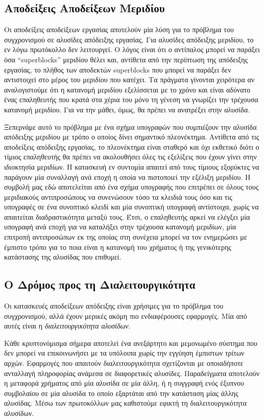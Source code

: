 \subsection*{Αποδείξεις Αποδείξεων Μεριδίου}
Οι αποδείξεις αποδείξεων εργασίας αποτελούν μία λύση για το πρόβλημα του συγχρονισμού σε
αλυσίδες απόδειξης εργασίας. Για αλυσίδες απόδειξης μεριδίου, το εν λόγω πρωτόκολλο δεν λειτουργεί.
Ο λόγος είναι ότι ο αντίπαλος μπορεί να παράξει όσα ``superblocks'' μεριδίου θέλει και,
αντίθετα από την περίπτωση της απόδειξης εργασίας, το πλήθος των αποδεκτών superblocks
που μπορεί να παράξει δεν αντιστοιχεί στο μέρος του μεριδίου που κατέχει. Τα πράγματα γίνονται
χειρότερα αν αναλογιστούμε ότι η κατανομή μεριδίου εξελίσσεται με το χρόνο και είναι αδύνατο
ένας επαληθευτής που κρατά στα χέρια του μόνο τη γένεση να γνωρίζει την τρέχουσα κατανομή μεριδίου.
Για να την μάθει, όμως, θα πρέπει να ανατρέξει στην αλυσίδα.

Ξεπερνάμε αυτό το πρόβλημα με ένα σχήμα υπογραφών που συμπιέζουν την αλυσίδα απόδειξης μεριδίου
με τρόπο ο οποίος δίνει σημαντικό πλεονέκτημα. Αντίθετα από τις αποδείξεις απόδειξης
εργασίας, το πλεονέκτημα είναι σταθερό και όχι εκθετικό διότι ο τίμιος επαληθευτής θα πρέπει
να ακολουθήσει όλες τις εξελίξεις που έχουν γίνει στην ιδιοκτησία μεριδίων. Η κατασκευή εν
συντομία απαιτεί από τους τίμιους εξορύκτες να παράγουν μία συναλλαγή ανά εποχή η οποία να πιστοποιεί
την εξέλιξη μεριδίου. Η συμβολή μας εδώ αποτελείται από ένα σχήμα υπογραφής που επιτρέπει σε όλους
τους μεριδιακούς αντιπροσώπους να συνενώσουν τόσο τα κλειδιά τους όσο και τις υπογραφές σε
ένα συνοπτικό κλειδί και μία συνοπτική υπογραφή αντίστοιχα, χωρίς να απαιτείται διαδραστικότητα
μεταξύ τους. Έτσι, ο επαληθευτής αρκεί να ελέγξει μία υπογραφή ανά εποχή για να καταλήξει
στην τρέχουσα κατανομή μεριδίων, μία επιτροπή αντιπροσώπων εκ της οποίας στη συνέχεια μπορεί να τον ενημερώσει με έμπιστο
τρόπο για το ποια είναι η κατανομή του χρήματος ή της γενικότερης κατάστασης της αλυσίδας που
επιθυμεί.

\subsection*{Ο Δρόμος προς τη Διαλειτουργικότητα}
Οι κατασκευές αποδείξεων απόδειξης είναι χρήσιμες για το πρόβλημα του συγχρονισμού, αλλά έχουν
μερικές ακόμη πιο ενδιαφέρουσες εφαρμογές. Μία από αυτές είναι η \emph{διαλειτουργικότητα αλυσίδων}.

Κάθε κρυπτονόμισμα σήμερα αποτελεί ένα ανεξάρτητο και μεμονωμένο σύστημα που δεν μπορεί να
επικοινωνήσει με τα υπόλοιπα χωρίς την εγγύηση έμπιστων τρίτων αρχών. Εφαρμογές που απαιτούν
διαλειτουργικότητα σχετίζονται με οποιαδήποτε ανταλλαγή πληροφορίας ανάμεσα σε διαφορετικές αλυσίδες.
Παραδείγματα αποτελούν η μεταφορά χρήματος από μία αλυσίδα σε μία άλλη, ή η συγγραφή ενός έξυπνου
συμβολαίου σε μία αλυσίδα το οποίο εξαρτάται από την κατάσταση μίας άλλης αλυσίδας.
Μέσω των πρωτοκόλλων μας καθιστούμε εφικτή τη διαλειτουργικότητα αλυσίδων.

